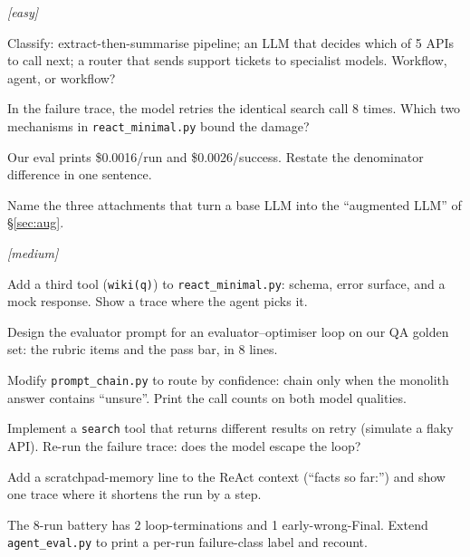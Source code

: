 \emph{[easy]}
\begin{exercise}
Classify: extract-then-summarise pipeline; an LLM that decides which
of 5 APIs to call next; a router that sends support tickets to
specialist models. Workflow, agent, or workflow?
\end{exercise}
\begin{exercise}
In the failure trace, the model retries the identical search call
8 times. Which two mechanisms in \texttt{react\_minimal.py} bound
the damage?
\end{exercise}
\begin{exercise}
Our eval prints \$0.0016/run and \$0.0026/success. Restate the
denominator difference in one sentence.
\end{exercise}
\begin{exercise}
Name the three attachments that turn a base LLM into the
``augmented LLM'' of \S\ref{sec:aug}.
\end{exercise}

\emph{[medium]}
\begin{exercise}
Add a third tool (\texttt{wiki(q)}) to \texttt{react\_minimal.py}:
schema, error surface, and a mock response. Show a trace where the
agent picks it.
\end{exercise}
\begin{exercise}
Design the evaluator prompt for an evaluator--optimiser loop on our
QA golden set: the rubric items and the pass bar, in 8 lines.
\end{exercise}
\begin{exercise}
Modify \texttt{prompt\_chain.py} to route by confidence: chain only
when the monolith answer contains ``unsure''. Print the call counts
on both model qualities.
\end{exercise}
\begin{exercise}
Implement a \texttt{search} tool that returns different results on
retry (simulate a flaky API). Re-run the failure trace: does the
model escape the loop?
\end{exercise}
\begin{exercise}
Add a scratchpad-memory line to the ReAct context (``facts so
far:'') and show one trace where it shortens the run by a step.
\end{exercise}
\begin{exercise}
The 8-run battery has 2 loop-terminations and 1 early-wrong-Final.
Extend \texttt{agent\_eval.py} to print a per-run failure-class
label and recount.
\end{exercise}

